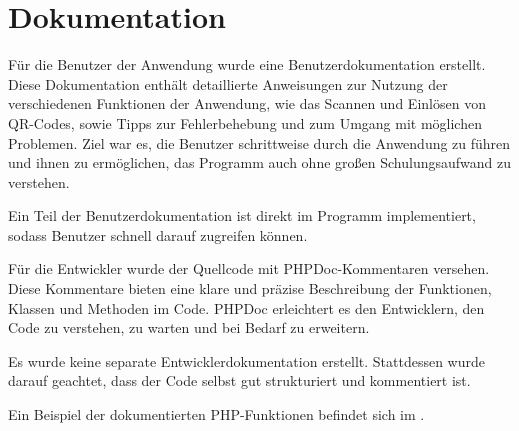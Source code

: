 \section{Dokumentation}
\label{sec:Dokumentation}

Für die Benutzer der Anwendung wurde eine Benutzerdokumentation erstellt. Diese Dokumentation enthält detaillierte Anweisungen zur Nutzung der verschiedenen Funktionen der Anwendung, wie das Scannen und Einlösen von QR-Codes, sowie Tipps zur Fehlerbehebung und zum Umgang mit möglichen Problemen. Ziel war es, die Benutzer schrittweise durch die Anwendung zu führen und ihnen zu ermöglichen, das Programm auch ohne großen Schulungsaufwand zu verstehen.

Ein Teil der Benutzerdokumentation ist direkt im Programm implementiert, sodass Benutzer schnell darauf zugreifen können.

Für die Entwickler wurde der Quellcode mit PHPDoc-Kommentaren versehen. Diese Kommentare bieten eine klare und präzise Beschreibung der Funktionen, Klassen und Methoden im Code. PHPDoc erleichtert es den Entwicklern, den Code zu verstehen, zu warten und bei Bedarf zu erweitern.

Es wurde keine separate Entwicklerdokumentation erstellt. Stattdessen wurde darauf geachtet, dass der Code selbst gut strukturiert und kommentiert ist.


Ein Beispiel der dokumentierten PHP-Funktionen befindet sich im .
